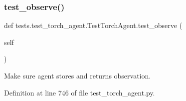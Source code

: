 \subsubsection{\texorpdfstring{test\+\_\+observe()}{test\_observe()}}
{\footnotesize\ttfamily def tests.\+test\+\_\+torch\+\_\+agent.\+Test\+Torch\+Agent.\+test\+\_\+observe (\begin{DoxyParamCaption}\item[{}]{self }\end{DoxyParamCaption})}

\begin{DoxyVerb}Make sure agent stores and returns observation.
\end{DoxyVerb}
 

Definition at line 746 of file test\+\_\+torch\+\_\+agent.\+py.


